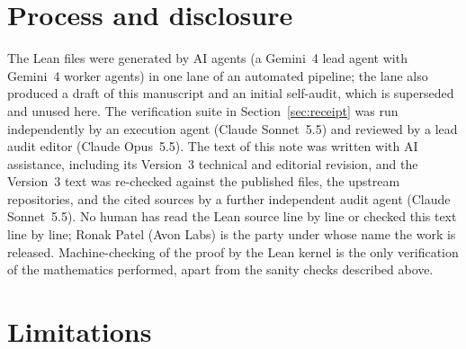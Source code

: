 \documentclass[11pt,reqno]{amsart}
\theoremstyle{remark}
\begin{document}
\section{Process and disclosure}\label{sec:process}

The Lean files were generated by AI agents (a Gemini~4 lead agent with Gemini~4 worker agents) in one lane of an automated pipeline; the lane also produced a draft of this manuscript and an initial self-audit, which is superseded and unused here. The verification suite in Section~\ref{sec:receipt} was run independently by an execution agent (Claude Sonnet~5.5) and reviewed by a lead audit editor (Claude Opus~5.5). The text of this note was written with AI assistance, including its Version~3 technical and editorial revision, and the Version~3 text was re-checked against the published files, the upstream repositories, and the cited sources by a further independent audit agent (Claude Sonnet~5.5). No human has read the Lean source line by line or checked this text line by line; Ronak Patel (Avon Labs) is the party under whose name the work is released. Machine-checking of the proof by the Lean kernel is the only verification of the mathematics performed, apart from the sanity checks described above.

\section{Limitations}\label{sec:limits}
\end{document}
